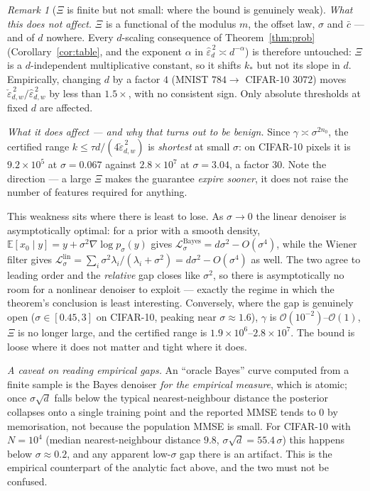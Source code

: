 \documentclass[11pt]{article}
\theoremstyle{remark}
\newtheorem{remark}{Remark}
\newcommand{\E}{\mathbb{E}}
\begin{document}
\begin{remark}[$\Xi$ is finite but not small: where the bound is genuinely weak]
\emph{What this does \emph{not} affect.} $\Xi$ is a functional of the modulus $m$, the offset law, $\sigma$ and $\bar c$ --- and of $d$ nowhere. Every $d$-scaling consequence of Theorem~\ref{thm:prob} (Corollary~\ref{cor:table}, and the exponent $\alpha$ in $\hat\varepsilon_d^{\,2}\asymp d^{-\alpha}$) is therefore untouched: $\Xi$ is a $d$-independent multiplicative constant, so it shifts $k_*$ but not its slope in $d$. Empirically, changing $d$ by a factor $4$ (MNIST $784 \to$ CIFAR-10 $3072$) moves $\check\varepsilon_{d,w}^{\,2}/\hat\varepsilon_{d,w}^{\,2}$ by less than $1.5\times$, with no consistent sign. Only absolute thresholds at fixed $d$ are affected.

\emph{What it does affect --- and why that turns out to be benign.} Since $\gamma\asymp\sigma^{2n_0}$, the certified range $k \le \tau d/(4\check\varepsilon_{d,w}^{\,2})$ is \emph{shortest} at small $\sigma$: on CIFAR-10 pixels it is $9.2\times10^{5}$ at $\sigma=0.067$ against $2.8\times10^{7}$ at $\sigma=3.04$, a factor $30$. Note the direction --- a large $\Xi$ makes the guarantee \emph{expire sooner}, it does not raise the number of features required for anything.

This weakness sits where there is least to lose. As $\sigma\to0$ the linear denoiser is asymptotically optimal: for a prior with a smooth density, $\E[x_0\mid y] = y + \sigma^2\nabla\log p_\sigma(y)$ gives $\mathcal L^{\mathrm{Bayes}}_\sigma = d\sigma^2 - O(\sigma^4)$, while the Wiener filter gives $\mathcal L^{\mathrm{lin}}_\sigma = \sum_i \sigma^2\lambda_i/(\lambda_i+\sigma^2) = d\sigma^2 - O(\sigma^4)$ as well. The two agree to leading order and the \emph{relative} gap closes like $\sigma^2$, so there is asymptotically no room for a nonlinear denoiser to exploit --- exactly the regime in which the theorem's conclusion is least interesting. Conversely, where the gap is genuinely open ($\sigma \in [0.45, 3]$ on CIFAR-10, peaking near $\sigma \approx 1.6$), $\gamma$ is $\mathcal O(10^{-2})$--$\mathcal O(1)$, $\Xi$ is no longer large, and the certified range is $1.9\times10^{6}$--$2.8\times10^{7}$. The bound is loose where it does not matter and tight where it does.

\emph{A caveat on reading empirical gaps.} An ``oracle Bayes'' curve computed from a finite sample is the Bayes denoiser \emph{for the empirical measure}, which is atomic; once $\sigma\sqrt d$ falls below the typical nearest-neighbour distance the posterior collapses onto a single training point and the reported MMSE tends to $0$ by memorisation, not because the population MMSE is small. For CIFAR-10 with $N=10^4$ (median nearest-neighbour distance $9.8$, $\sigma\sqrt d = 55.4\,\sigma$) this happens below $\sigma\approx0.2$, and any apparent low-$\sigma$ gap there is an artifact. This is the empirical counterpart of the analytic fact above, and the two must not be confused.
\end{remark}
\end{document}
